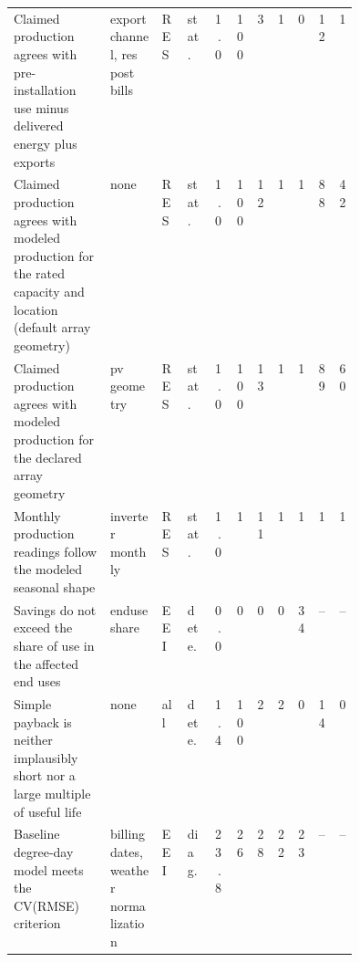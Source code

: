 \begin{tabular}{p{0.29\linewidth}p{0.15\linewidth}llrrrrrrr}
Claimed production agrees with pre-installation use minus delivered energy plus exports & export channel, res post bills & RES & stat. & 1.0 & 100 & 3 & 1 & 0 & 12 & 1 \\
Claimed production agrees with modeled production for the rated capacity and location (default array geometry) & none & RES & stat. & 1.0 & 100 & 12 & 1 & 1 & 88 & 42 \\
Claimed production agrees with modeled production for the declared array geometry & pv geometry & RES & stat. & 1.0 & 100 & 13 & 1 & 1 & 89 & 60 \\
Monthly production readings follow the modeled seasonal shape & inverter monthly & RES & stat. & 1.0 & 1 & 11 & 1 & 1 & 1 & 1 \\
Savings do not exceed the share of use in the affected end uses & enduse share & EEI & dete. & 0.0 & 0 & 0 & 0 & 34 & -- & -- \\
Simple payback is neither implausibly short nor a large multiple of useful life & none & all & dete. & 1.4 & 100 & 2 & 2 & 0 & 14 & 0 \\
Baseline degree-day model meets the CV(RMSE) criterion & billing dates, weather normalization & EEI & diag. & 23.8 & 26 & 28 & 22 & 23 & -- & -- \\
\hline
\end{tabular}
